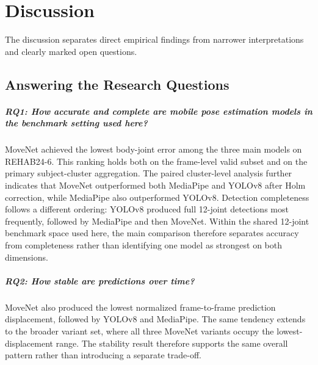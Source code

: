 \chapter{Discussion}
\label{ch:discussion}

The discussion separates direct empirical findings from narrower interpretations and clearly marked open questions.


\section{Answering the Research Questions}
\label{sec:rq-answers}

\paragraph{RQ1: How accurate and complete are mobile pose estimation models in the benchmark setting used here?}

MoveNet achieved the lowest body-joint error among the three main models on REHAB24-6. This ranking holds both on the frame-level valid subset and on the primary subject-cluster aggregation. The paired cluster-level analysis further indicates that MoveNet outperformed both MediaPipe and YOLOv8 after Holm correction, while MediaPipe also outperformed YOLOv8. Detection completeness follows a different ordering: YOLOv8 produced full 12-joint detections most frequently, followed by MediaPipe and then MoveNet. Within the shared 12-joint benchmark space used here, the main comparison therefore separates accuracy from completeness rather than identifying one model as strongest on both dimensions.

\paragraph{RQ2: How stable are predictions over time?}

MoveNet also produced the lowest normalized frame-to-frame prediction displacement, followed by YOLOv8 and MediaPipe. The same tendency extends to the broader variant set, where all three MoveNet variants occupy the lowest-displacement range. The stability result therefore supports the same overall pattern rather than introducing a separate trade-off.

